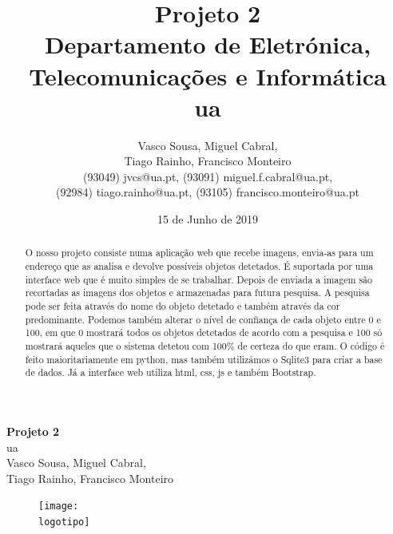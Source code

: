 \documentclass{report}
\begin{document}
%
\def\titulo{\textbf{Projeto 2}}
\def\data{15 de Junho de 2019}
\def\autores{Vasco Sousa, Miguel Cabral,\\ Tiago Rainho, Francisco Monteiro}
\def\autorescontactos{(93049) jvcs@ua.pt, (93091) miguel.f.cabral@ua.pt,\\ (92984) tiago.rainho@ua.pt, (93105) francisco.monteiro@ua.pt}

\def\departamento{Departamento de Eletrónica, Telecomunicações e Informática}
\def\empresa{\ac{ua}}
\def\logotipo{ua.pdf}
\def\codeua{\href{https://code.ua.pt/projects/labi2019-p2-g12}{CODEUA}}
%
%
\begin{titlepage}

\begin{center}
%
\vspace*{50mm}
%
{\Huge \titulo}\\ 
%
\vspace{10mm}
%
{\Large \empresa}\\
%
\vspace{10mm}
%
{\LARGE \autores}\\ 
%
\vspace{30mm}
%
\begin{figure}[h]
\center
\texttt{[image: \\logotipo]}
\end{figure}
%
\vspace{30mm}
\end{center}
%
\begin{flushright}

\end{flushright}
\end{titlepage}

\title{%
{\Huge\textbf{\titulo}}\\
{\Large \departamento\\ \empresa}
}
%
\author{%
    \autores \\
    \autorescontactos
}
%
\date{\data}
%

\maketitle


\begin{abstract}
O nosso projeto consiste numa aplicação web que recebe imagens, envia-as para um endereço que as analisa e devolve possíveis objetos detetados. É suportada por uma interface web que é muito simples de se trabalhar. Depois de enviada a imagem são recortadas as imagens dos objetos e armazenadas para futura pesquisa. A pesquisa pode ser feita através do nome do objeto detetado e também através da cor predominante. Podemos também alterar o nível de confiança de cada objeto entre 0 e 100, em que 0 mostrará todos os objetos detetados de acordo com a pesquisa e 100 só mostrará aqueles que o sistema detetou com 100\% de certeza do que eram. O código é feito maioritariamente em python, mas também utilizámos o Sqlite3 para criar a base de dados. Já a interface web utiliza \ac{html}, \ac{css}, \ac{js} e também Bootstrap.

\end{abstract}
\end{document}
